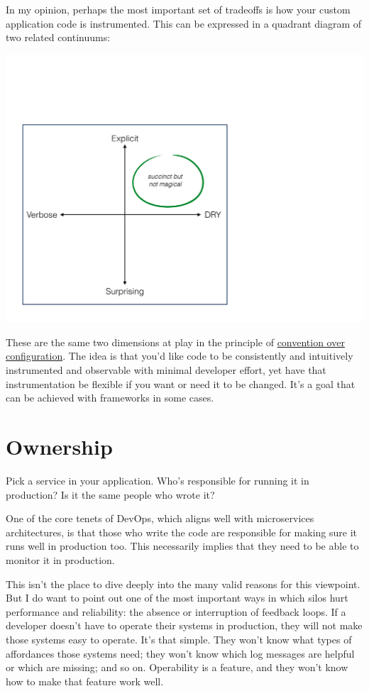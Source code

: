 \documentclass{vivid_layout}
\begin{document}
In my opinion, perhaps the most important set of tradeoffs is how your custom
application code is instrumented. This can be expressed in a
quadrant diagram of two related continuums:
\begin{center}
\includegraphics[width=.85\linewidth]{architecture-monitoring/coc}
\end{center}

These are the same two dimensions at play in the principle of
\href{https://en.wikipedia.org/wiki/Convention\_over\_configuration}{convention
over configuration}. The idea is that you'd like code to be consistently and
intuitively instrumented and observable with minimal developer effort, yet have
that instrumentation be flexible if you want or need it to be changed.
It's a goal that can be achieved with frameworks in some cases.

\section{Ownership}

Pick a service in your application. Who's responsible for running it in
production? Is it the same people who wrote it?

One of the core tenets of DevOps, which aligns well with microservices
architectures, is that those who write the code are responsible for making sure
it runs well in production too. This necessarily implies that they need to be
able to monitor it in production.

This isn't the place to dive deeply into the many valid reasons for this
viewpoint. But I do want to point out one of the most important ways in which
silos hurt performance and reliability: the absence or interruption of feedback
loops. If a developer doesn't have to operate their systems in production, they
will not make those systems easy to operate. It's that simple. They won't know
what types of affordances those systems need; they won't know which log messages
are helpful or which are missing; and so on. Operability is a feature, and they
won't know how to make that feature work well.
\end{document}
